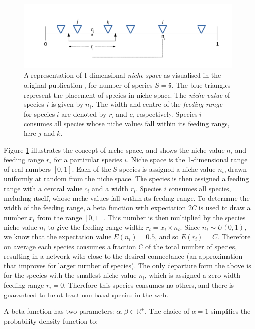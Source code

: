 \begin{figure}
	\centering
	\includegraphics[width=\textwidth]{"diagrams/niche_space"}
	\caption{A representation of 1-dimensional \emph{niche space} as visualised in the original publication \cite{williams2000simple}, for number of species $S=6$. The blue triangles represent the placement of species in niche space. The \emph{niche value} of species $i$ is given by $n_i$. The width and centre of the \emph{feeding range} for species $i$ are denoted by $r_i$ and $c_i$ respectively. Species $i$ consumes all species whose niche values fall within its feeding range, here $j$ and $k$.}
	\label{fig:niche_model}
\end{figure}


Figure \ref{fig:niche_model} illustrates the concept of niche space, and shows the niche value $n_i$ and feeding range $r_i$ for a particular species $i$. Niche space is the 1-dimensional range of real numbers $[0,1]$. Each of the $S$ species is assigned a niche value $n_i$, drawn uniformly at random from the niche space. The species is then assigned a feeding range with a central value $c_i$ and a width $r_i$. Species $i$ consumes all species, including itself, whose niche values fall within its feeding range. To determine the width of the feeding range, a beta function with expectation $2C$ is used to draw a number $x_i$ from the range $[0,1]$. This number is then multiplied by the species niche value $n_i$ to give the feeding range width: $r_i = x_i \times n_i$.  Since $n_i \sim U(0,1)$, we know that the expectation value $E(n_i) = 0.5$, and so $E(r_i) = C$. Therefore on average each species consumes a fraction $C$ of the total number of species, resulting in a network with close to the desired connectance (an approximation that improves for larger number of species). The only departure form the above is for the species with the smallest niche value $n_i$, which is assigned a zero-width feeding range $r_i = 0$. Therefore this species consumes no others, and there is guaranteed to be at least one basal species in the web.

A beta function has two parameters: $\alpha, \beta \in \mathbb{R^+}$. The choice of $\alpha = 1$ simplifies the probability density function to:


